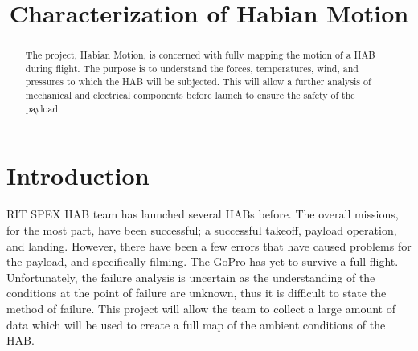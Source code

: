\documentclass[conference]{IEEEtran} %
\title{Characterization of Habian Motion}
\author{
  \IEEEauthorblockN{%
    James~E~Parkus\IEEEauthorrefmark{1}
  }
  \IEEEauthorblockA{%
    RIT Space Exploration, Rochester Institute of Technology \\ %
    Rochester, N.Y. \\
    Email:
    \IEEEauthorrefmark{1}jep7631@rit.edu
  }

}
\begin{document}
\maketitle%

\begin{abstract}
The project, Habian Motion, is concerned with fully mapping the motion of a HAB during flight. The purpose is to understand the
forces, temperatures, wind, and pressures to which the HAB will be subjected. This will allow a further analysis of mechanical
and electrical components before launch to ensure the safety of the payload.

\end{abstract}

\label{sec:nomenclature}
\newcommand{\nomunit}[1]{%
\renewcommand{\nomentryend}{\hspace*{\fill}#1}}
\renewcommand{\nompreamble}{

  }
\printnomenclature{}

\section{Introduction}\label{sec:introduction}

 RIT SPEX HAB team has launched several HABs before. The overall missions, for the most part, have been successful; a successful takeoff, payload operation, and landing.
However, there have been a few errors that have caused problems for the payload, and specifically filming. The GoPro has yet to survive a full flight.
Unfortunately, the failure analysis is uncertain as the understanding of the conditions at the point of failure are unknown, thus it is difficult to
state the method of failure. This project will allow the team to collect a large amount of data which will be used to create a full map of the ambient conditions
of the HAB\@.
\end{document}
